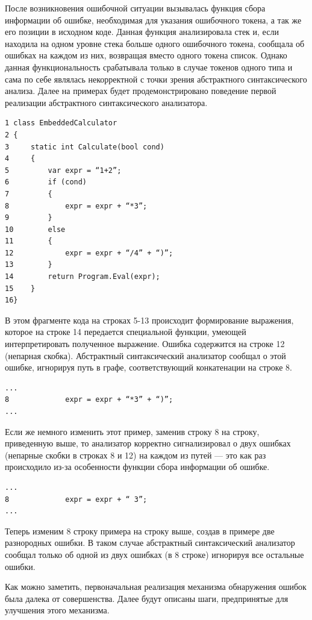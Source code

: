 \documentclass{matmex-diploma}
\begin{document}
После возникновения ошибочной ситуации вызывалась функция сбора информации об 
ошибке, необходимая для указания ошибочного токена, а так же его позиции в исходном 
коде. Данная функция анализировала стек и, если находила на одном уровне стека 
больше одного ошибочного токена, сообщала об ошибках на каждом из них, возвращая 
вместо одного токена список. Однако данная функциональность срабатывала только в 
случае токенов одного типа и сама по себе являлась некорректной с точки зрения 
абстрактного синтаксического анализа. Далее на примерах будет продемонстрировано 
поведение первой реализации абстрактного синтаксического анализатора.

\begin{verbatim}
1 class EmbeddedCalculator 
2 {
3     static int Calculate(bool cond)
4     {
5         var expr = “1+2”;
6         if (cond)
7         {
8             expr = expr + “*3”; 
9         }
10        else
11        {
12            expr = expr + “/4” + “)”;
13        }
14        return Program.Eval(expr);
15    }
16}
\end{verbatim}

В этом фрагменте кода на строках 5-13 происходит формирование выражения, которое  
на строке 14 передается специальной функции, умеющей интерпретировать полученное 
выражение. Ошибка содержится на строке 12 (непарная скобка). Абстрактный синтаксический 
анализатор сообщал о этой ошибке, игнорируя путь в графе, соответствующий конкатенации 
на строке 8.

\begin{verbatim}
...
8             expr = expr + “*3” + “)”; 
...
\end{verbatim}

Если же немного изменить этот пример, заменив строку 8 на строку, приведенную выше, 
то анализатор корректно сигнализировал о двух ошибках (непарные скобки в строках 
8 и 12) на каждом из путей — это как раз происходило из-за особенности функции 
сбора информации об ошибке.

\begin{verbatim}
...
8             expr = expr + “ 3”;
...
\end{verbatim}
Теперь изменим 8 строку примера на строку выше, создав в примере две разнородных 
ошибки. В таком случае абстрактный синтаксический анализатор сообщал только об 
одной из двух ошибках (в 8 строке) игнорируя все остальные ошибки.

Как можно заметить, первоначальная реализация механизма обнаружения ошибок была 
далека от совершенства. Далее будут описаны шаги, предпринятые для улучшения этого 
механизма. 
\end{document}
